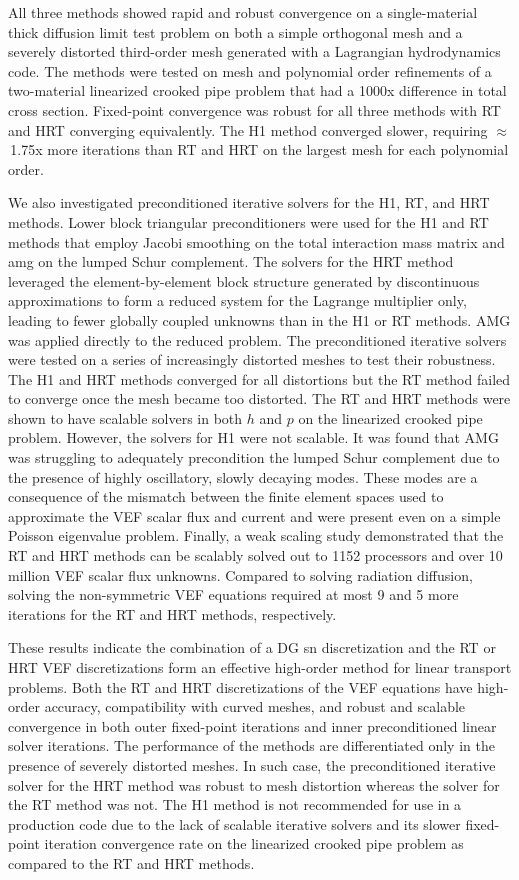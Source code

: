 \documentclass[../doc.tex]{subfiles}
\begin{document}
All three methods showed rapid and robust convergence on a single-material thick diffusion limit test problem on both a simple orthogonal mesh and a severely distorted third-order mesh generated with a Lagrangian hydrodynamics code. The methods were tested on mesh and polynomial order refinements of a two-material linearized crooked pipe problem that had a 1000x difference in total cross section. Fixed-point convergence was robust for all three methods with RT and HRT converging equivalently. The H1 method converged slower, requiring $\approx$\!\,1.75x more iterations than RT and HRT on the largest mesh for each polynomial order. 

We also investigated preconditioned iterative solvers for the H1, RT, and HRT methods. Lower block triangular preconditioners were used for the H1 and RT methods that employ Jacobi smoothing on the total interaction mass matrix and \gls{amg} on the lumped Schur complement. The solvers for the HRT method leveraged the element-by-element block structure generated by discontinuous approximations to form a reduced system for the Lagrange multiplier only, leading to fewer globally coupled unknowns than in the H1 or RT methods. AMG was applied directly to the reduced problem. The preconditioned iterative solvers were tested on a series of increasingly distorted meshes to test their robustness. The H1 and HRT methods converged for all distortions but the RT method failed to converge once the mesh became too distorted. The RT and HRT methods were shown to have scalable solvers in both $h$ and $p$ on the linearized crooked pipe problem. However, the solvers for H1 were not scalable. It was found that AMG was struggling to adequately precondition the lumped Schur complement due to the presence of highly oscillatory, slowly decaying modes. These modes are a consequence of the mismatch between the finite element spaces used to approximate the VEF scalar flux and current and were present even on a simple Poisson eigenvalue problem. Finally, a weak scaling study demonstrated that the RT and HRT methods can be scalably solved out to 1152 processors and over 10 million VEF scalar flux unknowns. Compared to solving radiation diffusion, solving the non-symmetric VEF equations required at most 9 and 5 more iterations for the RT and HRT methods, respectively.

These results indicate the combination of a DG \gls{sn} discretization and the RT or HRT VEF discretizations form an effective high-order method for linear transport problems. 
Both the RT and HRT discretizations of the VEF equations have high-order accuracy, compatibility with curved meshes, and robust and scalable convergence in both outer fixed-point iterations and inner preconditioned linear solver iterations. 
The performance of the methods are differentiated only in the presence of severely distorted meshes. In such case, the preconditioned iterative solver for the HRT method was robust to mesh distortion whereas the solver for the RT method was not. 
The H1 method is not recommended for use in a production code due to the lack of scalable iterative solvers and its slower fixed-point iteration convergence rate on the linearized crooked pipe problem as compared to the RT and HRT methods. 
\end{document}
